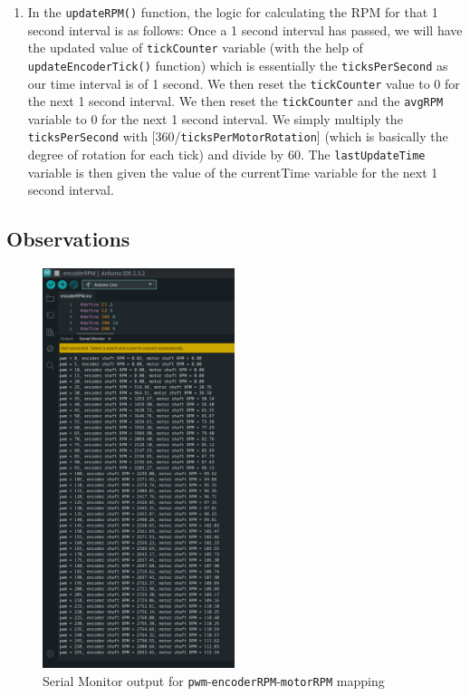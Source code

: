 \documentclass[12pt]{article}
\begin{document}
\begin{enumerate}
    \item In the \texttt{updateRPM()} function, the logic for calculating the RPM for that 1 second interval is as follows: Once a 1 second interval has passed, we will have the updated value of \texttt{tickCounter} variable (with the help of \texttt{updateEncoderTick()} function) which is essentially the \texttt{ticksPerSecond} as our time interval is of 1 second. We then reset the \texttt{tickCounter} value to 0 for the next 1 second interval. We then reset the \texttt{tickCounter} and the \texttt{avgRPM} variable to 0 for the next 1 second interval. We simply multiply the \texttt{ticksPerSecond} with [360/\texttt{ticksPerMotorRotation}] (which is basically the degree of rotation for each tick)  and divide by 60. The \texttt{lastUpdateTime} variable is then given the value of the currentTime variable for the next 1 second interval.
\end{enumerate}

\pagebreak
\subsection{Observations}

\begin{figure}[h]
    \centering
    \includegraphics[width=0.5\textwidth]{images/serial-pwm-rpm.png}
    \caption{Serial Monitor output for \texttt{pwm}-\texttt{encoderRPM}-\texttt{motorRPM} mapping}
\end{figure}
\end{document}
